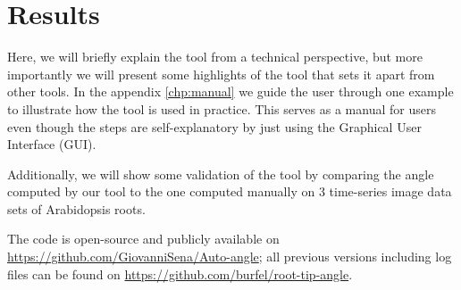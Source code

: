 
\chapter{Results} %

\label{results} %

%





Here, we will briefly explain the tool from a technical perspective, but more importantly  %
we will present some highlights of the tool that sets it apart from other tools. In the appendix \ref{chp:manual} we guide the user through one example to illustrate how the tool is used in practice. This serves as a manual for users even though the steps are self-explanatory by just using the Graphical User Interface (GUI). 

Additionally, we will show some validation of the tool by comparing the angle computed by our tool to the one computed manually on 3 time-series image data sets of Arabidopsis roots.

The code is open-source and publicly available on \url{https://github.com/GiovanniSena/Auto-angle}; all previous versions including log files can be found on \url{https://github.com/burfel/root-tip-angle}.


%
%


